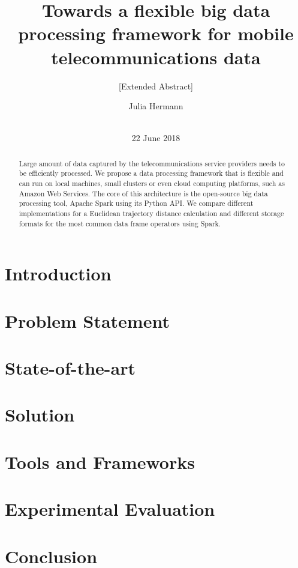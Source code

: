 \documentclass{sig-alternate-05-2015}
\begin{document}
\title{Towards a flexible big data processing framework for mobile telecommunications data}
\subtitle{[Extended Abstract]}

\author{
\alignauthor
Julia Hermann\\
       \\
}

\maketitle
\date{22 June 2018}
\begin{abstract}
Large amount of data captured by the telecommunications service providers needs to be efficiently processed. We propose a data processing framework that is flexible and can run on local machines, small clusters or even cloud computing platforms, such as Amazon Web Services. The core of this architecture is the open-source big data processing tool, Apache Spark using its Python API. We compare different implementations for a Euclidean trajectory distance calculation and different storage formats for the most common data frame operators using Spark.
\end{abstract}
\section{Introduction}
\section{Problem Statement}
\section{State-of-the-art}
\section{Solution}
\section{Tools and Frameworks}
\section{Experimental Evaluation}
\section{Conclusion}



\end{document}
